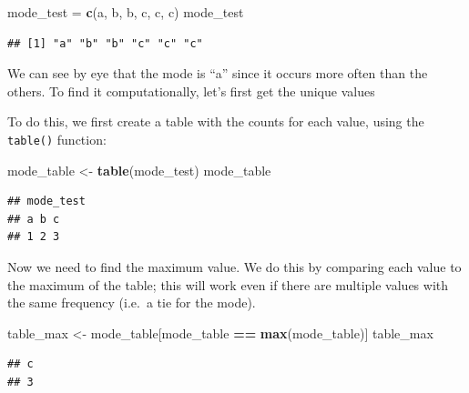 \documentclass[
  12pt,
]{book}
\newenvironment{Shaded}{\begin{snugshade}}{\end{snugshade}}
\newcommand{\FunctionTok}[1]{\textcolor[rgb]{0.13,0.29,0.53}{\textbf{#1}}}
\newcommand{\NormalTok}[1]{#1}
\newcommand{\OtherTok}[1]{\textcolor[rgb]{0.56,0.35,0.01}{#1}}
\newcommand{\SpecialCharTok}[1]{\textcolor[rgb]{0.81,0.36,0.00}{\textbf{#1}}}
\newcommand{\StringTok}[1]{\textcolor[rgb]{0.31,0.60,0.02}{#1}}
\begin{document}
\begin{Shaded}
\begin{Highlighting}[]
\NormalTok{mode\_test }\OtherTok{=} \FunctionTok{c}\NormalTok{(}\StringTok{\textquotesingle{}a\textquotesingle{}}\NormalTok{, }\StringTok{\textquotesingle{}b\textquotesingle{}}\NormalTok{, }\StringTok{\textquotesingle{}b\textquotesingle{}}\NormalTok{, }\StringTok{\textquotesingle{}c\textquotesingle{}}\NormalTok{, }\StringTok{\textquotesingle{}c\textquotesingle{}}\NormalTok{, }\StringTok{\textquotesingle{}c\textquotesingle{}}\NormalTok{)}
\NormalTok{mode\_test}
\end{Highlighting}
\end{Shaded}

\begin{verbatim}
## [1] "a" "b" "b" "c" "c" "c"
\end{verbatim}

We can see by eye that the mode is ``a'' since it occurs more often than the others. To find it computationally, let's first get the unique values

To do this, we first create a table with the counts for each value, using the \texttt{table()} function:

\begin{Shaded}
\begin{Highlighting}[]
\NormalTok{mode\_table }\OtherTok{\textless{}{-}} \FunctionTok{table}\NormalTok{(mode\_test)}
\NormalTok{mode\_table}
\end{Highlighting}
\end{Shaded}

\begin{verbatim}
## mode_test
## a b c 
## 1 2 3
\end{verbatim}

Now we need to find the maximum value. We do this by comparing each value to the maximum of the table; this will work even if there are multiple values with the same frequency (i.e.~a tie for the mode).

\begin{Shaded}
\begin{Highlighting}[]
\NormalTok{table\_max }\OtherTok{\textless{}{-}}\NormalTok{ mode\_table[mode\_table }\SpecialCharTok{==} \FunctionTok{max}\NormalTok{(mode\_table)]}
\NormalTok{table\_max}
\end{Highlighting}
\end{Shaded}

\begin{verbatim}
## c 
## 3
\end{verbatim}
\end{document}
